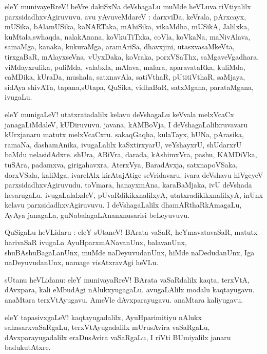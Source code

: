\documentclass{article}
\begin{document}
\begin{mn}
eleY munivayeRreV! beVre dakiSxNa deVshagaLu muMde heVLuva riVtiyalilx parxsidadhxvAgiruvuvu.
avu yAvuveMdareV : darxviDa, keVrala, pArxcayx, mUSika, bAlamUSika, kaNARTaka,
mAhiSika, vikaMdha, mUSikA, Jalilxka, kuMtala,swhaqda, nalakAnana, koVkuTiTxka, coVla, 
koVkaNa, maNivAlava, samaMga, kanaka, kukuraMga, aramAriSa, dhavxjini, utasxvasaMkeVta,
tirxgaBaR, mAlayxseVna, vUyxDaka, koVraka, porxVSaThx, saMgaveVgadhara, viMdayxrulika,
puliMda, valabxla, mAlava, malara, aparavataRka, kuliMda, caMDika, kUraDa, mushala, 
satxnavAla, satiVthaR, pUtitiVthaR, saMjaya, sidAya shivATa, tapana,sUtapa, QuSika, vidhaBaR,
satxMgana, parataMgana, ivugaLu.
\end{mn}

\begin{mn}
eleY munigaLeV! utatxratadalilx kelavu deVshagaLu keVvala melxVcaCx janagaLiMdaleV, 
kUDiruvuvu. javana, kAMBoVja, I deVshagaLalilxruvavaru kUrxjanaru matutx melxVcaCxru. 
sakaqGaqha, kulaTayx, hUNa, pArasika, ramaNa, dashamAnika, ivugaLalilx kaSxtirxyarU, 
veYshayxrU, shUdarxrU baMdu  nelasidAdxre. shUra, ABiVra, darada, kAshimxVra, pashu,
KAMDiVka, tuSAra, padamxva, girigahavxra, AterxVya, BaradAvxja, satxnapoVSaka, dorxVSala,
kaliMga, ivarelAlx kirAtajAtige seVridavaru. ivara deVshavu hiVgeyeV parxsidadhxvAgiruvudu.
toVmara, hanayxmAna, karaBaMjaka, ivU deVshada hesarugaLu. ivugaLalalxdeV, pUvaRdikikxnalilxyA,
utatxradikikxnalilxyA, inUnx kelavu parxsidadhxvAgiruvuvu. I deVshagaLalilx dhamARthaRkAmagaLu, 
AyAya janagaLa, guNabalagaLAnanxnusarisi beLeyuvuvu.
\end{mn}


\begin{mn}
QuSigaLu heVLidaru : eleY sUtaneV! BArata vaSaR, heYmavatavaSaR, 
matutx harivaSaR ivugaLa AyuHparxmANavanUnx, balavanUnx, shuBAshuBagaLanUnx, muMde naDeyuvudanUnx,
hiMde naDedudanUnx, Iga naDeyuvudanUnx, namage visAtxravAgi heVLu.
\end{mn}

\begin{mn}
sUtanu heVLidanu: eleY munivayaRreV! BArata vaSaRdalilx kaqta, terxVtA, dAvxpara, kali 
eMbudAgi nAlukxyugagaLu. avugaLAlilx modalu kaqtayugavu. anaMtara terxVtAyugavu.
AmeVle dAvxparayugavu. anaMtara kaliyugavu.
\end{mn}

\begin{mn}
eleY tapasivxgaLeV! kaqtayugadalilx, AyuHparimitiyu nAlukx sahasarxvaSaRgaLu, terxVtAyugadalilx
mUrusAvira vaSaRgaLu, dAvxparayugadalilx eraDusAvira vaSaRgaLu,
I riVti BUmiyalilx janaru badukutAtxre.
\end{mn}
\end{document}
